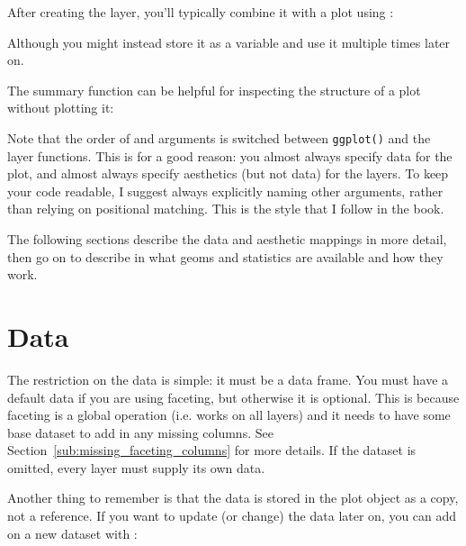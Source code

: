 After creating the layer, you'll typically combine it with a plot using  \code{+}:

% 


\noindent Although you might instead store it as a variable and use it multiple times later on.  

The summary function can be helpful for inspecting the structure of a plot without plotting it:

%


Note that the order of  and  arguments is switched between {\tt ggplot()} and the layer functions.  This is for a good reason: you almost always specify data for the plot, and almost always specify aesthetics (but not data) for the layers.  To keep your code readable, I suggest always explicitly naming other arguments, rather than relying on positional matching.  This is the style that I follow in the book.

The following sections describe the data and aesthetic mappings in more detail, then go on to describe in what geoms and statistics are available and how they work.

\section{Data}
\label{sec:data}

The restriction on the data is simple: it must be a data frame.  You must have a default data if you are using faceting, but otherwise it is optional.  This is because faceting is a global operation (i.e. works on all layers) and it needs to have some base dataset to add in any missing columns.  See Section~\ref{sub:missing_faceting_columns} for more details.  If the dataset is omitted, every layer must supply its own data.

Another thing to remember is that the data is stored in the plot object as a copy, not a reference.  If you want to update (or change) the data later on, you can add on a new dataset with \code{\%+\%}:

% 


